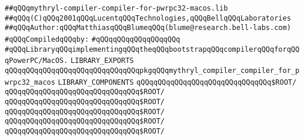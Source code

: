 \label{src/lib/core/mythryl-compiler-compiler/mythryl-compiler-compiler-for-pwrpc32-macos.lib}
\verb|##qQQqmythryl-compiler-compiler-for-pwrpc32-macos.lib|\newline
\verb|##qQQq(C)qQQq2001qQQqLucentqQQqTechnologies,qQQqBellqQQqLaboratories|\newline
\verb|##qQQqAuthor:qQQqMatthiasqQQqBlumeqQQq(blume@research.bell-labs.com)|\newline
\newline
\verb|#qQQqCompiledqQQqby:|\newline
\verb|#qQQqqQQqqQQqqQQqqQQq|\newline
\newline
\newline
\newline
\verb|#qQQqLibraryqQQqimplementingqQQqtheqQQqbootstrapqQQqcompilerqQQqforqQQqPowerPC/MacOS.|\newline
\newline
\newline
\newline
\verb|LIBRARY_EXPORTS|\newline
\newline
\verb|qQQqqQQqqQQqqQQqqQQqqQQqqQQqqQQqpkgqQQqmythryl_compiler_compiler_for_pwrpc32_macos|\newline
\newline
\newline
\newline
\verb|LIBRARY_COMPONENTS|\newline
\newline
\verb|qQQqqQQqqQQqqQQqqQQqqQQqqQQqqQQq$ROOT/|\newline
\verb|qQQqqQQqqQQqqQQqqQQqqQQqqQQqqQQq$ROOT/|\newline
\verb|qQQqqQQqqQQqqQQqqQQqqQQqqQQqqQQq$ROOT/|\newline
\verb|qQQqqQQqqQQqqQQqqQQqqQQqqQQqqQQq$ROOT/|\newline
\verb|qQQqqQQqqQQqqQQqqQQqqQQqqQQqqQQq$ROOT/|\newline
\newline
\verb|qQQqqQQqqQQqqQQqqQQqqQQqqQQqqQQq$ROOT/|\newline

